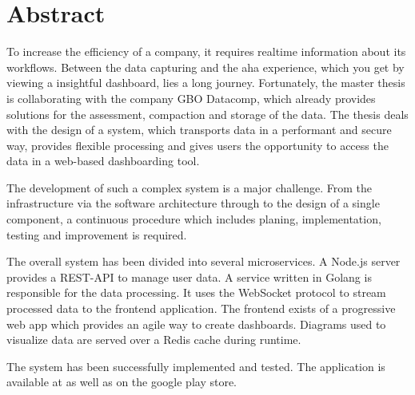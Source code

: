 \chapter*{Abstract}
\label{chap:abstract}

To increase the efficiency of a company, it requires realtime
information about its workflows. Between the data capturing
and the aha experience, which you get by viewing a 
insightful dashboard, lies a long journey. Fortunately,
the master thesis is collaborating with the company GBO Datacomp,
which already provides solutions for the assessment, compaction and
storage of the data. The thesis deals with the design of a system,
which transports data in a performant and secure way, provides
flexible processing and gives users the opportunity to access
the data in a web-based dashboarding tool.

The development of such a complex system is a major challenge.
From the infrastructure via the software architecture through to
the design of a single component, a continuous procedure which includes
planing, implementation, testing and improvement is required.

The overall system has been divided into several microservices. A Node.js
server provides a REST-API to manage user data. A service written in Golang is
responsible for the data processing. It uses the WebSocket protocol to stream
processed data to the frontend application. The frontend exists of a progressive
web app which provides an agile way to create dashboards. Diagrams used to visualize
data are served over a Redis cache during runtime.

The system has been successfully implemented and tested. The application is available
at  as well as on the google play store.
